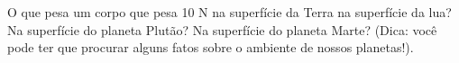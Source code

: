 O que pesa um corpo que pesa 10 N na superfície da Terra na superfície da lua? Na superfície do planeta Plutão? Na superfície do planeta Marte? (Dica: você pode ter que procurar alguns fatos sobre o ambiente de nossos planetas!).

